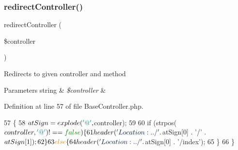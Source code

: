 \hypertarget{class_base_controller_a85ddb683efc64655be063b697f631beb}{}\label{class_base_controller_a85ddb683efc64655be063b697f631beb} 
\subsubsection{\texorpdfstring{redirect\+Controller()}{redirectController()}}
{\footnotesize\ttfamily redirect\+Controller (\begin{DoxyParamCaption}\item[{}]{\$controller }\end{DoxyParamCaption})\hspace{0.3cm}{\ttfamily [protected]}}

Redirects to given controller and method


\begin{DoxyParams}[1]{Parameters}
string & {\em \$controller} & \\
\hline
\end{DoxyParams}


Definition at line 57 of file Base\+Controller.\+php.


\begin{DoxyCode}
57                                                        \{
58         $atSign = explode(\textcolor{charliteral}{'@'}, $controller);
59 
60         \textcolor{keywordflow}{if} (strpos($controller, \textcolor{charliteral}{'@'}) !== \textcolor{keyword}{false}) \{
61             header(\textcolor{stringliteral}{'Location:../'} . $atSign[0] . \textcolor{charliteral}{'/'} . $atSign[1]);
62         \}
63         \textcolor{keywordflow}{else} \{
64             header(\textcolor{stringliteral}{'Location:../'} . $atSign[0] . \textcolor{stringliteral}{'/index'});
65         \}
66     \}
\end{DoxyCode}
\hypertarget{class_base_controller_a9f95c7503770ed9c974005b363ec3d00}{}\label{class_base_controller_a9f95c7503770ed9c974005b363ec3d00} 
